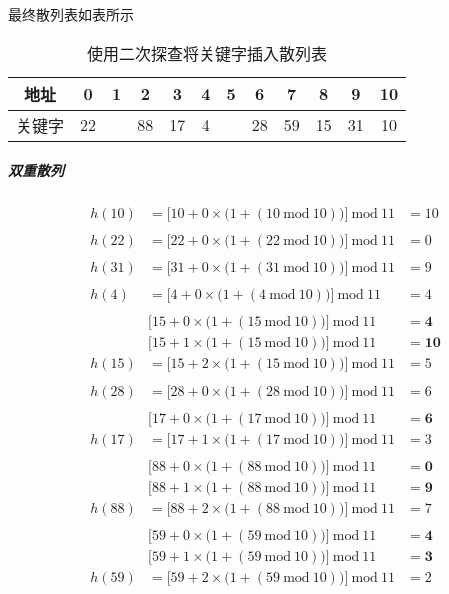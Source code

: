\documentclass{article}
\begin{document}
最终散列表如表所示
\begin{table}[H]
    \centering
    \begin{tabular}{|c|c|c|c|c|c|c|c|c|c|c|c|}
    \hline
    地址 & 0 & 1 & 2 & 3 & 4 & 5 & 6 & 7 & 8 & 9 & 10 \\ \hline
    关键字 & 22 &  & 88 & 17 & 4 &  & 28 & 59 & 15 & 31 & 10 \\ \hline
    \end{tabular}
    \caption{使用二次探查将关键字插入散列表}
\end{table}

\subparagraph{双重散列}
\begin{align*}
    &h(10) &= \big[10 + 0 \times \big(1 + (10\ \text{mod}\ 10)\big)\big] \ \text{mod}\  11 &= 10 \\
    \\
    &h(22) &= \big[22 + 0 \times \big(1 + (22\ \text{mod}\ 10)\big)\big] \ \text{mod}\  11 &= 0 \\
    \\
    &h(31) &= \big[31 + 0 \times \big(1 + (31\ \text{mod}\ 10)\big)\big] \ \text{mod}\  11 &= 9 \\
    \\
    &h(4) &= \big[4 + 0 \times \big(1 + (4\ \text{mod}\ 10)\big)\big] \ \text{mod}\  11 &= 4 \\
    \\
    &&\big[15 + 0 \times \big(1 + (15\ \text{mod}\ 10)\big)\big] \ \text{mod}\  11 &= \mathbf{4} \\
    &&\big[15 + 1 \times \big(1 + (15\ \text{mod}\ 10)\big)\big] \ \text{mod}\  11 &= \mathbf{10} \\
    &h(15) &= \big[15 + 2 \times \big(1 + (15\ \text{mod}\ 10)\big)\big] \ \text{mod}\  11 &= 5 \\
    \\
    &h(28) &= \big[28 + 0 \times \big(1 + (28\ \text{mod}\ 10)\big)\big] \ \text{mod}\  11 &= 6 \\
    \\
    &&\big[17 + 0 \times \big(1 + (17\ \text{mod}\ 10)\big)\big] \ \text{mod}\  11 &= \mathbf{6} \\
    &h(17) &= \big[17 + 1 \times \big(1 + (17\ \text{mod}\ 10)\big)\big] \ \text{mod}\  11 &= 3 \\
    \\
    &&\big[88 + 0 \times \big(1 + (88\ \text{mod}\ 10)\big)\big] \ \text{mod}\  11 &= \mathbf{0} \\
    &&\big[88 + 1 \times \big(1 + (88\ \text{mod}\ 10)\big)\big] \ \text{mod}\  11 &= \mathbf{9} \\
    &h(88) &= \big[88 + 2 \times \big(1 + (88\ \text{mod}\ 10)\big)\big] \ \text{mod}\  11 &= 7 \\
    \\
    &&\big[59 + 0 \times \big(1 + (59\ \text{mod}\ 10)\big)\big] \ \text{mod}\  11 &= \mathbf{4} \\
    &&\big[59 + 1 \times \big(1 + (59\ \text{mod}\ 10)\big)\big] \ \text{mod}\  11 &= \mathbf{3} \\
    &h(59) &= \big[59 + 2 \times \big(1 + (59\ \text{mod}\ 10)\big)\big] \ \text{mod}\  11 &= 2
\end{align*}
\end{document}
